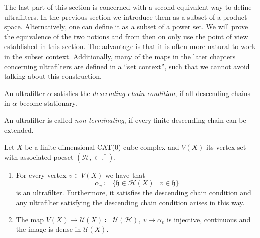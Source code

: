 The last part of this section is concerned with a second equivalent way to define ultrafilters. In the previous section we introduce them as a subset of a product space. Alternatively, one can define it as a subset of a power set. We will prove the equivalence of the two notions and from then on only use the point of view established in this section. The advantage is that it is often more natural to work in the subset context. Additionally, many of the maps in the later chapters concerning ultrafilters are defined in a \enquote{set context}, such that we cannot avoid talking about this construction. 




\begin{defin}
  An ultrafilter \(\alpha\) satisfies the \emph{descending chain condition}, if all descending chains in \(\alpha\) become stationary.

  An ultrafilter is called \emph{non-terminating}, if every finite descending chain can be extended.
\end{defin}

\begin{thm}
  \label{thm:roller-compactification}
  Let \(X\) be a finite-dimensional CAT(0) cube complex and \(V(X)\) its vertex set with associated pocset \((\mathcal{H}, \subset, ^\ast)\).
  \begin{enumerate}
  \item For every vertex \(v \in V(X)\) we have that
    \[
      \alpha_v \coloneqq \{\mathfrak{h} \in \mathcal{H}(X) \mid v \in \mathfrak{h}\}
    \]
    is an ultrafilter. Furthermore, it satisfies the descending chain condition and any ultrafilter satisfying the descending chain condition arises in this way.
  \item The map \(V(X) \to \mathcal{U}(X) \coloneqq \mathcal{U}(\mathcal{H}),\ v \mapsto \alpha_v\) is injective, continuous and the image is dense in \(\mathcal{U}(X)\). 
  \end{enumerate}
\end{thm}

